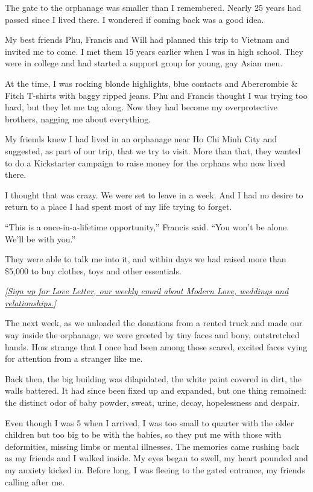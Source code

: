 The gate to the orphanage was smaller than I remembered. Nearly 25 years
had passed since I lived there. I wondered if coming back was a good
idea.

My best friends Phu, Francis and Will had planned this trip to Vietnam
and invited me to come. I met them 15 years earlier when I was in high
school. They were in college and had started a support group for young,
gay Asian men.

At the time, I was rocking blonde highlights, blue contacts and
Abercrombie \& Fitch T-shirts with baggy ripped jeans. Phu and Francis
thought I was trying too hard, but they let me tag along. Now they had
become my overprotective brothers, nagging me about everything.

My friends knew I had lived in an orphanage near Ho Chi Minh City and
suggested, as part of our trip, that we try to visit. More than that,
they wanted to do a Kickstarter campaign to raise money for the orphans
who now lived there.

I thought that was crazy. We were set to leave in a week. And I had no
desire to return to a place I had spent most of my life trying to
forget.

``This is a once-in-a-lifetime opportunity,'' Francis said. ``You won't
be alone. We'll be with you.''

They were able to talk me into it, and within days we had raised more
than \$5,000 to buy clothes, toys and other essentials.

\emph{{[}}\href{https://www.nytimes.com/newsletters/love-letter}{\emph{Sign
up for Love Letter, our weekly email about Modern Love, weddings and
relationships.}}\emph{{]}}

The next week, as we unloaded the donations from a rented truck and made
our way inside the orphanage, we were greeted by tiny faces and bony,
outstretched hands. How strange that I once had been among those scared,
excited faces vying for attention from a stranger like me.

Back then, the big building was dilapidated, the white paint covered in
dirt, the walls battered. It had since been fixed up and expanded, but
one thing remained: the distinct odor of baby powder, sweat, urine,
decay, hopelessness and despair.

Even though I was 5 when I arrived, I was too small to quarter with the
older children but too big to be with the babies, so they put me with
those with deformities, missing limbs or mental illnesses. The memories
came rushing back as my friends and I walked inside. My eyes began to
swell, my heart pounded and my anxiety kicked in. Before long, I was
fleeing to the gated entrance, my friends calling after me.

